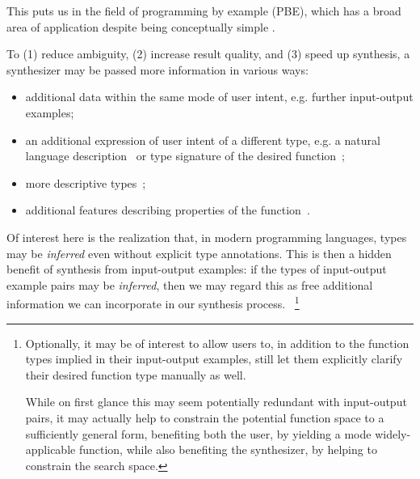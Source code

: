 \documentclass{article}
\begin{document}
This puts us in the field of programming by example (PBE),
which has a broad area of application despite being conceptually simple%
.

To (1) reduce ambiguity, (2) increase result quality, and (3) speed up synthesis, a synthesizer may be passed more information in various ways:
\begin{itemize}
    \item additional data within the same mode of user intent, e.g. further input-output examples;
    \item an additional expression of user intent of a different type, e.g. a natural language description~\citep{polosukhin2018neural} or type signature of the desired function~\citep{myth};
    \item more descriptive types~\citep{synquid};
    \item additional features describing properties of the function~\citep{odena2020learning}.
\end{itemize}

Of interest here is the realization that, in modern programming languages, types may be \emph{inferred} even without explicit type annotations.
This is then a hidden benefit of synthesis from input-output examples:
if the types of input-output example pairs may be \emph{inferred},
then we may regard this as free additional information we can incorporate in our synthesis process.%
~\footnote{
    Optionally, it may be of interest to allow users to,
    in addition to the function types implied in their input-output examples,
    still let them explicitly clarify their desired function type manually as well.

    While on first glance this may seem potentially redundant with input-output pairs,
    it may actually help to constrain the potential function space to a sufficiently general form,
    benefiting both the user,
    by yielding a mode widely-applicable function,
    while also benefiting the synthesizer,
    by helping to constrain the search space.
}
\end{document}
